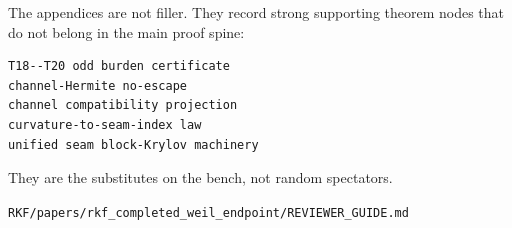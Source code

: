 The appendices are not filler. They record strong supporting theorem nodes that do not belong in the main proof spine:

\begin{verbatim}
T18--T20 odd burden certificate
channel-Hermite no-escape
channel compatibility projection
curvature-to-seam-index law
unified seam block-Krylov machinery
\end{verbatim}

They are the substitutes on the bench, not random spectators.

\begin{flushright}\small\texttt{RKF/papers/rkf\_completed\_weil\_endpoint/REVIEWER\_GUIDE.md}\end{flushright}
